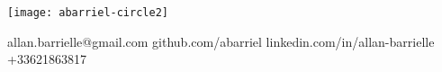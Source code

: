 \begin{minipage}{.22\linewidth}
    \texttt{[image: abarriel-circle2]}
\end{minipage}
\begin{minipage}{.30\linewidth}
\end{minipage}
\begin{minipage}{.6\linewidth}
    \workitems    
    {allan.barrielle@gmail.com}
    {github.com/abarriel}
    {linkedin.com/in/allan-barrielle}
    {+33621863817}
\end{minipage}\hfill
